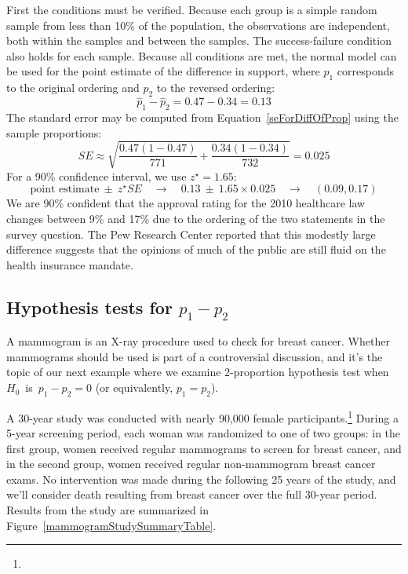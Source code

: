 \begin{example}
First the conditions must be verified. Because each group is a simple random sample from less than 10\% of the population, the observations are independent, both within the samples and between the samples. The success-failure condition also holds for each sample. Because all conditions are met, the normal model can be used for the point estimate of the difference in support, where $p_1$ corresponds to the original ordering and $p_2$ to the reversed ordering:
$$\hat{p}_{1} - \hat{p}_{2} = 0.47 - 0.34 = 0.13$$
The standard error may be computed from Equation~\eqref{seForDiffOfProp} using the sample proportions:
$$SE \approx \sqrt{\frac{0.47(1-0.47)}{771} + \frac{0.34(1-0.34)}{732}} = 0.025$$
For a 90\% confidence interval, we use $z^{\star} = 1.65$:
$$\text{point estimate} \ \pm\ z^{\star}SE \quad \to \quad 0.13 \ \pm\ 1.65 \times  0.025 \quad \to \quad (0.09, 0.17)$$
We are 90\% confident that the approval rating for the 2010 healthcare law changes between 9\% and 17\% due to the ordering of the two statements in the survey question. The Pew Research Center reported that this modestly large difference suggests that the opinions of much of the public are still fluid on the health insurance mandate.
\end{example}


\subsection{Hypothesis tests for $p_1 -p_2$}


A mammogram is an X-ray procedure used to check for breast cancer. Whether mammograms should be used is part of a controversial discussion, and it's the topic of our next example where we examine 2-proportion hypothesis test when $H_0$~is~$p_1 - p_2 = 0$ (or equivalently, $p_1 = p_2$).

A 30-year study was conducted with nearly 90,000 female participants.\footnote{} During a 5-year screening period, each woman was randomized to one of two groups: in the first group, women received regular mammograms to screen for breast cancer, and in the second group, women received regular non-mammogram breast cancer exams. No intervention was made during the following 25 years of the study, and we'll consider death resulting from breast cancer over the full 30-year period. Results from the study are summarized in Figure~\ref{mammogramStudySummaryTable}.

